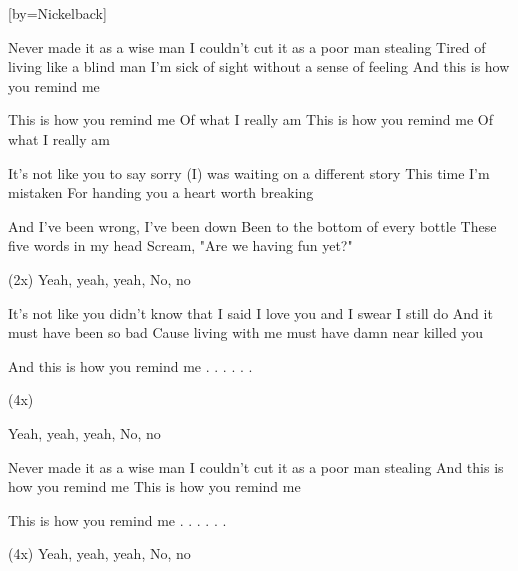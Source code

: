  

[by=Nickelback]



\beginverse
Never made it as a wise man
I couldn't cut it as a poor man stealing
Tired of living like a blind man
I'm sick of sight without a sense of feeling
And this is how you remind me
\endverse

\beginchorus
This is how you remind me
Of what I really am
This is how you remind me
Of what I really am

It's not like you to say sorry
(I) was waiting on a different story
This time I'm mistaken
For handing you a heart worth breaking

And I've been wrong, I've been down
Been to the bottom of every bottle
These five words in my head
Scream, "Are we having fun yet?"

(2x)  Yeah, yeah, yeah,  No, no
\endchorus

\beginverse
It's not like you didn't know that
I said I love you and I swear I still do
And it must have been so bad
Cause living with me must have damn near killed you
\endverse

\beginchorus
And this is how you remind me
. . .
. . .



\begin{Large}(4x) \end{Large}  Yeah, yeah, yeah,  No, no
\endchorus

\beginverse
Never made it as a wise man
I couldn't cut it as a poor man stealing
And this is how you remind me
This is how you remind me
\endverse

\beginchorus
This is how you remind me
. . . 
. . . 



(4x)  Yeah, yeah, yeah,  No, no
\endchorus



\endsong
